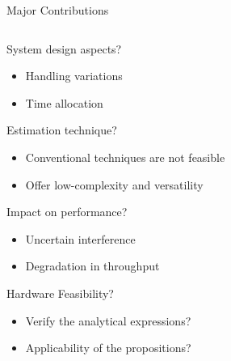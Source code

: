 \documentclass[16pt]{beamer}
\newcommand{\fs}[2]{\fontsize{#1 pt}{#2}\selectfont}
\begin{document}
\begin{frame}[t]{Major Contributions}
\begin{columns}
\begin{column}[t]{0.53\columnwidth}
				\fs{8}{8}
				\begin{block}{\footnotesize System design aspects?} %
					\begin{itemize} 
						\item Handling variations 
						\item Time allocation 
					\end{itemize}
				\end{block}
				\vspace{3.4mm}
				{
				\begin{block}{\footnotesize Estimation technique?} %
					\begin{itemize}
						\item Conventional techniques are not feasible  
						\item Offer low-complexity and versatility %
					\end{itemize}
				\end{block}
				}
				\vspace{-1.1mm}
				{
				\begin{block}{\footnotesize Impact on performance?}%
					\begin{itemize}
						\item Uncertain interference 
						\item Degradation in throughput 
					\end{itemize} 
				\end{block}
				}	
				\vspace{-0.9mm}
				{
				\begin{block}{\footnotesize Hardware Feasibility?}%
					\begin{itemize}
					\item Verify the analytical expressions? 
					\item Applicability of the propositions? 
					\end{itemize}	
				\end{block}
				}
		\end{column}
		
		\begin{column}{0.03\columnwidth}
		\end{column}
		

\end{columns}
\end{frame}
\end{document}
